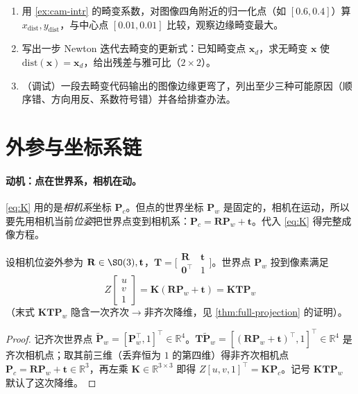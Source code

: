 \begin{practice}
\begin{enumerate}
  \item 用 \cref{ex:cam-intr} 的畸变系数，对图像四角附近的归一化点（如 $[0.6,0.4]$）算 $x_{\text{dist}},y_{\text{dist}}$，与中心点 $[0.01,0.01]$ 比较，观察边缘畸变最大。
  \item 写出一步 Newton 迭代去畸变的更新式：已知畸变点 $\mathbf{x}_d$，求无畸变 $\mathbf{x}$ 使 $\text{dist}(\mathbf{x})=\mathbf{x}_d$，给出残差与雅可比（$2\times2$）。
  \item （调试）一段去畸变代码输出的图像边缘更弯了，列出至少三种可能原因（顺序错、方向用反、系数符号错）并各给排查办法。
\end{enumerate}
\end{practice}

\section{外参与坐标系链}
\label{sec:cam-chain}

\paragraph{动机：点在世界系，相机在动。}
\cref{eq:K} 用的是\emph{相机系}坐标 $\mathbf{P}_c$。但点的世界坐标 $\mathbf{P}_w$ 是固定的，相机在运动，所以要先用相机当前\emph{位姿}把世界点变到相机系\cite{gaoxiang2019slam14}：$\mathbf{P}_c=\mathbf{R}\mathbf{P}_w+\mathbf{t}$。代入 \cref{eq:K} 得完整成像方程。

\begin{theorem}[完整成像方程]\label{thm:full-projection}
设相机位姿外参为 $\mathbf{R}\in\SO(3),\mathbf{t}$，$\mathbf{T}=\big[\begin{smallmatrix}\mathbf{R}&\mathbf{t}\\\mathbf{0}^\top&1\end{smallmatrix}\big]$。世界点 $\mathbf{P}_w$ 投到像素满足
\begin{equation}
  \boxed{\ Z\begin{bmatrix}u\\v\\1\end{bmatrix}=\mathbf{K}(\mathbf{R}\mathbf{P}_w+\mathbf{t})=\mathbf{K}\mathbf{T}\mathbf{P}_w\ }
  \label{eq:full-projection}
\end{equation}
（末式 $\mathbf{K}\mathbf{T}\mathbf{P}_w$ 隐含一次齐次$\to$非齐次降维，见 \cref{thm:full-projection} 的证明）。
\end{theorem}
\begin{proof}
记齐次世界点 $\tilde{\mathbf{P}}_w=[\mathbf{P}_w^\top,1]^\top\in\mathbb{R}^4$。$\mathbf{T}\tilde{\mathbf{P}}_w=[(\mathbf{R}\mathbf{P}_w+\mathbf{t})^\top,1]^\top\in\mathbb{R}^4$ 是齐次相机点；取其前三维（丢弃恒为 $1$ 的第四维）得非齐次相机点 $\mathbf{P}_c=\mathbf{R}\mathbf{P}_w+\mathbf{t}\in\mathbb{R}^3$，再左乘 $\mathbf{K}\in\mathbb{R}^{3\times3}$ 即得 $Z[u,v,1]^\top=\mathbf{K}\mathbf{P}_c$。记号 $\mathbf{K}\mathbf{T}\mathbf{P}_w$ 默认了这次降维。
\end{proof}

